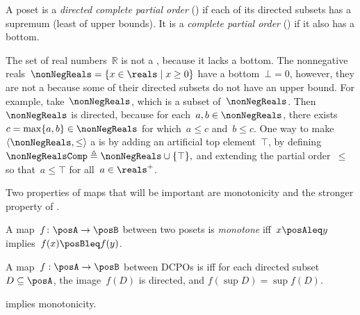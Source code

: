 \begin{definition}[Completeness]
\label{def:cpo}A poset is a \emph{directed complete partial order}
(\DCPO) if each of its directed subsets has a supremum (least of
upper bounds). It is a \emph{complete partial order} (\CPO) if it
also has a bottom.

\end{definition}
\begin{example}
\label{exa:Rcomp}The set of real numbers~$\mathbb{R}$ is not
a \CPO, because it lacks a bottom. The nonnegative reals~$\nonNegReals=\{x\in\reals\mid x\geq0\}$
have a bottom~$\bot=0$, however, they are not a \DCPO because some
of their directed subsets do not have an upper bound. For example,
take~$\nonNegReals$, which is a subset of~$\nonNegReals$. Then~$\nonNegReals$
is directed, because for each~$a,b\in\nonNegReals$, there exists~$c=\max\{a,b\}\in\nonNegReals$
for which~$a\leq c$ and~$b\leq c$. One way to make~$\left\langle \nonNegReals,\leq\right\rangle $
a \CPO is by adding an artificial top element~$\top$, by defining~$\nonNegRealsComp\triangleq\nonNegReals\cup\{\top\},$
and extending the partial order~$\leq$ so that~$a\leq\top$ for
all~$a\in\reals^{+}$. 
\end{example}

Two properties of maps that will be important are monotonicity and
the stronger property of \scottcontinuity.
\begin{definition}[Monotonicity]
\label{def:monotone}A map~$f\colon\posA\rightarrow\posB$ between
two posets is \emph{monotone} iff~$x\posAleq y$ implies~$f(x)\posBleq f(y)$. 
\end{definition}

\begin{definition}[\scottcontinuity]
\label{def:scott}A map~$f:\posA\rightarrow\posB$ between DCPOs
is\textbf{ }\emph{\scottcontinuous{}}\textbf{ }iff for each directed
subset~$D\subseteq\posA$, the image~$f(D)$ is directed, and $f(\sup D)=\sup f(D).$
\end{definition}
\begin{remark}
\scottcontinuity implies monotonicity.
\end{remark}

